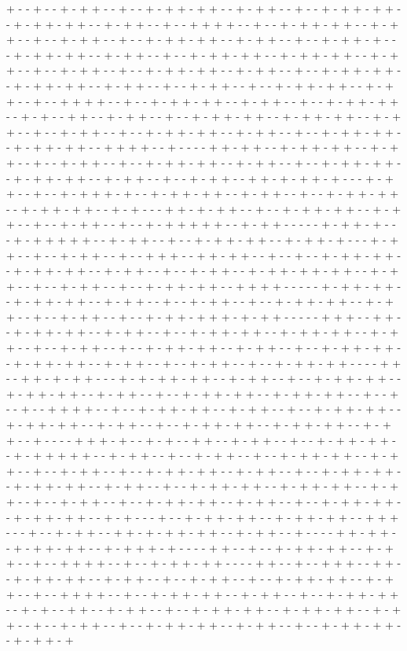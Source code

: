 + - - + - - + - + + - - + - - + - + + - + + - - + - + + - - + - - + - + + - + + - - + - + + - + + - - + - + + - - + - - + + + + - - + - - + - + + - + + - - + - + + - - + - - + - + + - - + - - + - + + - + + - - + - + + - - + - - + - + + - + - - - + - + + - + + - - + - + + - - + - - + - + + - + + - - + - + + - + + - - + - + + - - + - - + - + + - - + - - + - + + - + + - - + - + + - - + - - + - + + - + + - - + - + + - + + - - + - + + - - + - - + - + + - - + - - + - + + - + + - - + - + + - - + - - + + + + - - + - - + - + + - + + - - + - + + - - + - - + - + + - + + - - + - + - - + + - - + - + + - - + - - + - + + - + + - - + - + + - + + - - + - + + - - + - - + - + + - - + - - + - + + - + + - - + - + + - - + - - + - + + - + + - - + - + + - + + - - + + + + - - + - - - - + + - + + - - + - + + - + + - - + - + + - - + - - + - + + - - + - - + - + + - + + - - + - + + - - + - - + - + + - + + - - + - + + - + + - - + - + + - - + - - + - + + - - + + - + - + + - + - - - + - + + - - + - - + - + + + - + - - + - + + - + + - - + - + + - - + - - + - + + - + + - - + - + + - + + - - + - + - - - + + - + - + + - - + - - + - + + - + + - - + - + + - - + - - + - + + - - + - - + - + + + + + - - + - + + - - - - - + - + + - + - - - + - + + + + + - - + - + + - - + - - + - + + - + + - - + - + + - + - - - + - + + - - + - - + - + + - - + - - + + + - - + + - + + - - + - - + - - + - + + - + + - - + - + + - + + - - + - + + - - + - - + - + + - - + - + + - + + - + + - - + - + + - - + - - + - + + - - + - - + - + + - + + - - + + + + - - - - - + - + + - + + - - + - + + - + + - - + - + + - - + - - + - + + - - + - - + - + + - + + - - + - + + - - + - - + - + + - - + - - + - + + - + + + - + - + + - - - - - + + + - - + + - - + - + + - + + - - + - + + - - + - - + - + + - + + - - + - + + - + + - - + - + + - - + - - + - + + - - + - - + - + + - + + - - + - + + - - + - - + - + + - + + - - + - + + - + + - - + - + + - - + - - + - + + - - + - - + - + + - + + - - - - + + - - + + - + - + + - - - + - + - + + - + + - - + - + + - - + - - + - + + - + + - - + - + + - + + - - + - + + - - + - - + - + + - + + - - + - + + - + + - - + - - + - - + - - + + + + - - + - - + - + + - + + - - + - + + - - + - - + - + + - + + - - + - + + - + + - - + - + + - - + - - + - + + - + + - - + - + + - + + - - + - + + - - + - - - - + + + - + - - + - + - - + + - - + - + + - - + - - + - + + - + + - - + - + + + + + - - + - + + - - + - - + - + + - - + - - + - + + - + + - - + - + + - - + - - + - + + - - + - - + - + + - + + - - + - + + - - + - - + - + + - + + - - + - + + - + + - - + - + + - - + - - + - + + - + + - - + - + + - + + - - + - + + - - + - - + - + + - - + - - + - + + - + + - - + - + + - - + - - + - + + - + + - - + - + + - + + - - + - + - - - + - - + - + + - + + - - + - + + - + + - - + + + - - - + - - + - + + - - + + - + - + + - + + - - + - + + - - + - - - - + + - + + - - + - + + - + + - - + - + + + - + - - - - + + - - + - - + - + + - + + - - + - + + - - + - - + + + + - - + - - + - + + - + + - - - - + + - - + - - + + + - - + + - - + - + + - + + - - + - + + - - + - - + - + + - - + - - + - + + - + + - - + - + + - - + - - + + + + - - + - - + - + + - + + - - + - + + - - + - - + - + + - + + - - + - + - - + + - - + - + + - - + - - + - + + - + + - - + - + + - + + - - + - + + - - + - - + - + + - - + - - + - + + - + + - - + - + + - - + - - + - + + - + + - - + - + + - + 